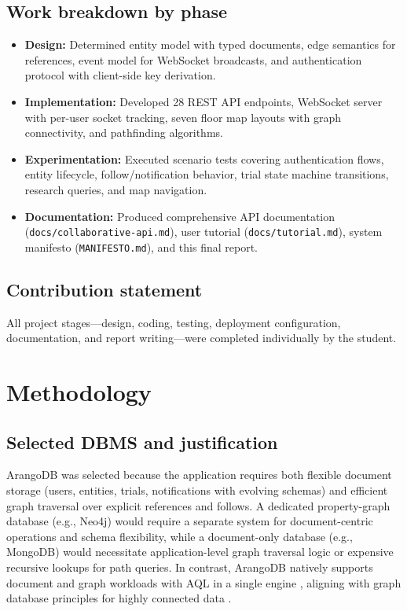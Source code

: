\documentclass[13pt,a4paper]{report}
\begin{document}
\section{Work breakdown by phase}
\begin{itemize}
    \item \textbf{Design:} Determined entity model with typed documents, edge semantics for references, event model for WebSocket broadcasts, and authentication protocol with client-side key derivation.
    \item \textbf{Implementation:} Developed 28 REST API endpoints, WebSocket server with per-user socket tracking, seven floor map layouts with graph connectivity, and pathfinding algorithms.
    \item \textbf{Experimentation:} Executed scenario tests covering authentication flows, entity lifecycle, follow/notification behavior, trial state machine transitions, research queries, and map navigation.
    \item \textbf{Documentation:} Produced comprehensive API documentation (\texttt{docs/collaborative-api.md}), user tutorial (\texttt{docs/tutorial.md}), system manifesto (\texttt{MANIFESTO.md}), and this final report.
\end{itemize}

\section{Contribution statement}
All project stages---design, coding, testing, deployment configuration, documentation, and report writing---were completed individually by the student.

\chapter{Methodology}

\section{Selected DBMS and justification}
ArangoDB was selected because the application requires both flexible document storage (users, entities, trials, notifications with evolving schemas) and efficient graph traversal over explicit references and follows. A dedicated property-graph database (e.g., Neo4j) would require a separate system for document-centric operations and schema flexibility, while a document-only database (e.g., MongoDB) would necessitate application-level graph traversal logic or expensive recursive lookups for path queries. In contrast, ArangoDB natively supports document and graph workloads with AQL in a single engine \cite{arangodb_aql,arangodb_multimodel}, aligning with graph database principles for highly connected data \cite{angles2008property,robinson2015graph}.
\end{document}
